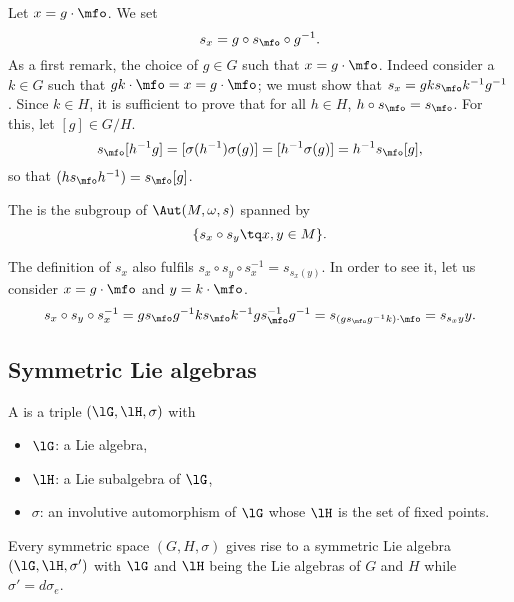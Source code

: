 Let $x=g\cdot\mfo$. We set
\[
   s_x=g\circ s_{\mfo}\circ g^{-1}.
\]
As a first remark, the choice of $g\in G$ such that $x=g\cdot\mfo$. Indeed consider a $k\in G$ such that $gk\cdot\mfo=x=g\cdot\mfo$; we must show that $s_x=gks_{\mfo}k^{-1} g^{-1}$. Since $k\in H$, it is sufficient to prove that for all $h\in H$, $h\circ s_{\mfo}=s_{\mfo}$. For this, let $[g]\in G/H$.
\begin{equation}
s_{\mfo}[h^{-1} g]=[\sigma(h^{-1})\sigma(g)]
    =[h^{-1} \sigma(g)]
    =h^{-1} s_{\mfo}[g],
\end{equation}
so that $(hs_{\mfo}h^{-1})=s_{\mfo}[g]$.

The  is the subgroup of $\Aut(M,\omega,s)$ spanned by
\[
  \{ s_x\circ s_y\tq x,y\in M \}.
\]

The definition of $s_x$ also fulfils $s_x\circ s_y\circ s_x^{-1}=s_{  s_x(y)  }$. In order to see it, let us consider $x=g\cdot\mfo$ and $y=k\cdot\mfo$.
\begin{equation}
s_x\circ s_y\circ s_x^{-1}=g s_{\mfo}g^{-1} ks_{\mfo}k^{-1} gs_{\mfo}^{-1} g^{-1}
                 =s_{ (gs_{\mfo}g^{-1} k)\cdot\mfo }
                 =s_{s_xy}y.
\end{equation}


\subsection{Symmetric Lie algebras}

A  is a triple $(\lG,\lH,\sigma)$ with

\begin{itemize}
\item $\lG$: a Lie algebra,
\item $\lH$: a Lie subalgebra of $\lG$,
\item $\sigma$: an involutive automorphism of $\lG$ whose $\lH$ is the set of fixed points.
\end{itemize}

\begin{proposition}
Every symmetric space $(G,H,\sigma)$ gives rise to a symmetric Lie algebra $(\lG,\lH,\sigma')$ with $\lG$ and $\lH$ being the Lie algebras of $G$ and $H$ while $\sigma'=d\sigma_e$.
\end{proposition}

